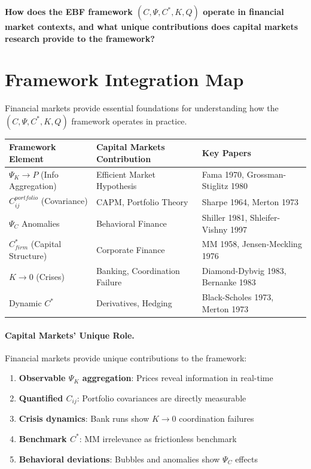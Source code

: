 \begin{tcolorbox}[colback=red!5!white, colframe=red!75!black,
    title=The Fundamental Question]
\textbf{How does the EBF framework $(C, \Psi, C^*, K, Q)$ operate in financial
market contexts, and what unique contributions does capital markets research
provide to the framework?}
\end{tcolorbox}


\section{Framework Integration Map}
\label{sec:Y-integration-map}

Financial markets provide essential foundations for understanding how
the $(C, \Psi, C^*, K, Q)$ framework operates in practice.

\begin{center}
\renewcommand{\arraystretch}{1.4}
\begin{tabular}{|l|l|l|}
\hline
\textbf{Framework Element} & \textbf{Capital Markets Contribution} & \textbf{Key Papers} \\
\hline
$\Psi_K \to P$ (Info Aggregation) & Efficient Market Hypothesis & Fama 1970, Grossman-Stiglitz 1980 \\
$C_{ij}^{portfolio}$ (Covariance) & CAPM, Portfolio Theory & Sharpe 1964, Merton 1973 \\
$\Psi_C$ Anomalies & Behavioral Finance & Shiller 1981, Shleifer-Vishny 1997 \\
$C^*_{firm}$ (Capital Structure) & Corporate Finance & MM 1958, Jensen-Meckling 1976 \\
$K \to 0$ (Crises) & Banking, Coordination Failure & Diamond-Dybvig 1983, Bernanke 1983 \\
Dynamic $C^*$ & Derivatives, Hedging & Black-Scholes 1973, Merton 1973 \\
\hline
\end{tabular}
\end{center}

\paragraph{Capital Markets' Unique Role.}
Financial markets provide unique contributions to the framework:
\begin{enumerate}
    \item \textbf{Observable $\Psi_K$ aggregation}: Prices reveal information in real-time
    \item \textbf{Quantified $C_{ij}$}: Portfolio covariances are directly measurable
    \item \textbf{Crisis dynamics}: Bank runs show $K \to 0$ coordination failures
    \item \textbf{Benchmark $C^*$}: MM irrelevance as frictionless benchmark
    \item \textbf{Behavioral deviations}: Bubbles and anomalies show $\Psi_C$ effects
\end{enumerate}


